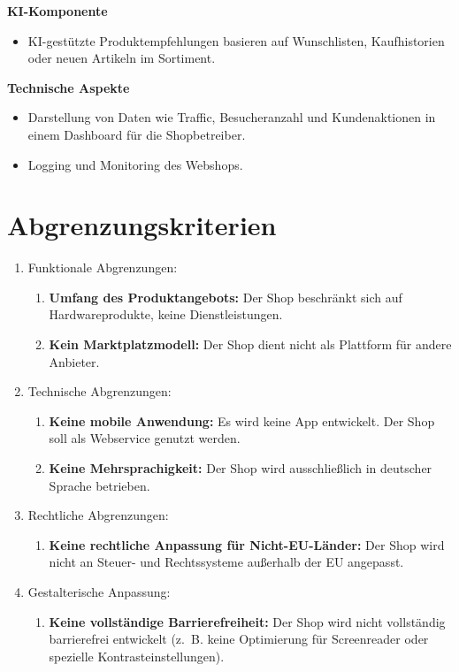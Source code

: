 \documentclass[%
	ngerman,
	12pt,
	a4paper,
	oneside,
	parskip=full
]{scrbook}
\begin{document}
	\vspace{0.5cm}
	\textbf{KI-Komponente}
	\begin{itemize}
		\item KI-gestützte Produktempfehlungen basieren auf Wunschlisten, Kaufhistorien oder neuen Artikeln im Sortiment.
	\end{itemize}

	\vspace{0.5cm}
	\textbf{Technische Aspekte}
	\begin{itemize}
		\item Darstellung von Daten wie Traffic, Besucheranzahl und Kundenaktionen in einem Dashboard für die Shopbetreiber.
		\item Logging und Monitoring des Webshops.
	\end{itemize}


\section{Abgrenzungskriterien}
\begin{enumerate}
	\item Funktionale Abgrenzungen:
	\begin{enumerate}
		\item \textbf{Umfang des Produktangebots:} Der Shop beschränkt sich auf Hardwareprodukte, keine Dienstleistungen.
		\item \textbf{Kein Marktplatzmodell:} Der Shop dient nicht als Plattform für andere Anbieter.
	\end{enumerate}
	\item Technische Abgrenzungen:
	\begin{enumerate}
		\item \textbf{Keine mobile Anwendung:} Es wird keine App entwickelt. Der Shop soll als Webservice genutzt werden.
		\item \textbf{Keine Mehrsprachigkeit:} Der Shop wird ausschließlich in deutscher Sprache betrieben.
	\end{enumerate}
	\item Rechtliche Abgrenzungen:
	\begin{enumerate}
		\item \textbf{Keine rechtliche Anpassung für Nicht-EU-Länder:} Der Shop wird nicht an Steuer- und Rechtssysteme außerhalb der EU angepasst.
	\end{enumerate}
	\item Gestalterische Anpassung:
	\begin{enumerate}
		\item \textbf{Keine vollständige Barrierefreiheit:} Der Shop wird nicht vollständig barrierefrei entwickelt (z.~B. keine Optimierung für Screenreader oder spezielle Kontrasteinstellungen).
	\end{enumerate}
\end{enumerate}
\end{document}
